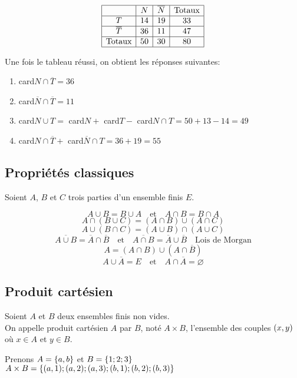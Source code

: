 $$
\begin{array}{|c|c|c|c|}
\hline
      & N & \overline{N} & \text{Totaux} \\
\hline
T     & 14 & 19 & 33 \\
\hline
\overline{T} & 36 & 11 & 47 \\
\hline
\text{Totaux} & 50 & 30 & 80 \\
\hline
\end{array}
$$



Une fois le tableau réussi, on obtient les réponses suivantes:
\begin{enumerate}
\item card$ N\cap \overline{T} =36$
\item card$ \overline{N} \cap \overline{T}=11 $
\item card$ N \cup T =$ card$ N + $ card$ T -$ card$ N \cap T = 50+13-14=49$
\item card$ N\cap \overline{T} +$ card$ \overline{N}\cap T= 36+19=55 $
\end{enumerate}

\subsection*{Propriétés classiques}
Soient $A $, $ B $ et  $ C$ trois parties d'un ensemble finis $ E $.

 \[A \cup B= B \cup A \quad \textrm{et} \quad A\cap B = B \cap A \]
\[ A\cap (B\cup C)=(A\cap B)\cup (A \cap C)  \]
\[  A\cup(B\cap C)=(A\cup B)\cap(A \cup C) \]
\[ \overline{A\cup B}= \overline{A} \cap \overline{B} \quad \textrm{et} \quad \overline{A\cap B} = \overline{A}\cup \overline{B}\quad \textrm{Lois de  Morgan} \]
\[  A= (A\cap B) \cup (A\cap \overline{B}) \]
\[ A \cup \overline{A}= E \quad \textrm{et}\quad A\cap \overline{A} =\varnothing\]
\subsection*{Produit cartésien}
\begin{definition}
Soient $A $ et  $B $ deux ensembles finis non vides.\\
On appelle produit cartésien $ A$ par $B $, noté $A\times B$, l'ensemble des couples $ \left(x, y\right) $ où $x\in A $ et $y\in B. $
\end{definition}
\begin{example}
Prenons $ A=\left\{a, b\right\} $ et $ B= \left\{1; 2; 3\right\} $\\
$ A\times B=\left\{(a, 1); (a, 2);(a,3);(b,1);(b,2);(b,3)  \right\} $
\end{example}

